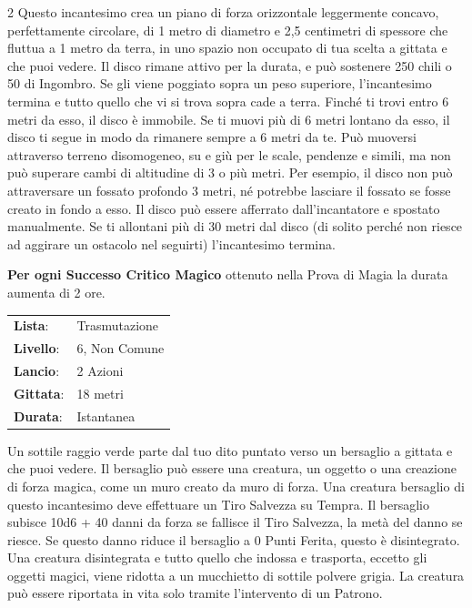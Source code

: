 \begin{multicols}{2}
Questo incantesimo crea un piano di forza orizzontale leggermente concavo, perfettamente circolare, di 1 metro di diametro e 2,5 centimetri di spessore che fluttua a 1 metro da terra, in uno spazio non occupato di tua scelta a gittata e che puoi vedere. Il disco rimane attivo per la durata, e può sostenere 250 chili o 50 di Ingombro. Se gli viene poggiato sopra un peso superiore, l'incantesimo termina e tutto quello che vi si trova sopra cade a terra. Finché ti trovi entro 6 metri da esso, il disco è immobile. Se ti muovi più di 6 metri lontano da esso, il disco ti segue in modo da rimanere sempre a 6 metri da te. Può muoversi attraverso terreno disomogeneo, su e giù per le scale, pendenze e simili, ma non può superare cambi di altitudine di 3 o più metri. Per esempio, il disco non può attraversare un fossato profondo 3 metri, né potrebbe lasciare il fossato se fosse creato in fondo a esso. Il disco può essere afferrato dall'incantatore e spostato manualmente. Se ti allontani più di 30 metri dal disco (di solito perché non riesce ad aggirare un ostacolo nel seguirti) l'incantesimo termina.

\textbf{Per ogni Successo Critico Magico} ottenuto nella Prova di Magia la durata aumenta di 2 ore.

\noindent\begin{tabularx}{\linewidth}{p{1.9cm}X}
	\rowcolor{gray!20}\textbf{Lista}: & Trasmutazione \\
	\textbf{Livello}: & 6, Non Comune \\
	\rowcolor{gray!20}\textbf{Lancio}: & 2 Azioni \\
	\textbf{Gittata}: & 18 metri \\
	\rowcolor{gray!20}\textbf{Durata}: & Istantanea \\
\end{tabularx}\smallskip

Un sottile raggio verde parte dal tuo dito puntato verso un bersaglio a gittata e che puoi vedere. Il bersaglio può essere una creatura, un oggetto o una creazione di forza magica, come un muro creato da muro di forza. Una creatura bersaglio di questo incantesimo deve effettuare un Tiro Salvezza su Tempra. Il bersaglio subisce 10d6 + 40 danni da forza se fallisce il Tiro Salvezza, la metà del danno se riesce. Se questo danno riduce il bersaglio a 0 Punti Ferita, questo è disintegrato. Una creatura disintegrata e tutto quello che indossa e trasporta, eccetto gli oggetti magici, viene ridotta a un mucchietto di sottile polvere grigia. La creatura può essere riportata in vita solo tramite l'intervento di un Patrono.


\end{multicols}
